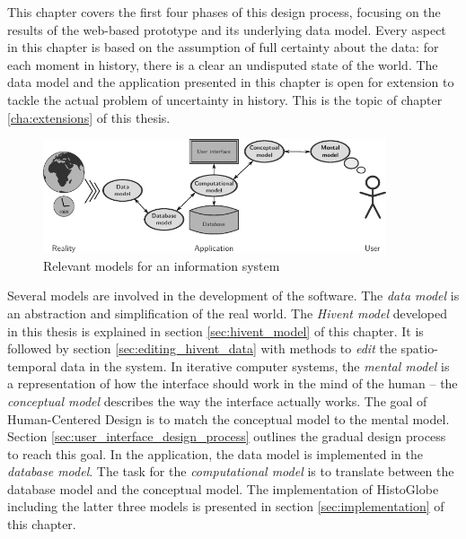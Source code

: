 This chapter covers the first four phases of this design process, focusing on the results of the web-based prototype and its underlying data model. Every aspect in this chapter is based on the assumption of full certainty about the data: for each moment in history, there is a clear an undisputed state of the world. The data model and the application presented in this chapter is open for extension to tackle the actual problem of uncertainty in history. This is the topic of chapter \ref{cha:extensions} of this thesis.

\begin{figure}[H]
  \vspace{1.5em}
  \centering
  \includegraphics[width=0.9\textwidth]{graphics/development/models}
  \caption{Relevant models for an information system}
  \label{fig:models}
\end{figure}

Several models are involved in the development of the software. The \emph{data model} is an abstraction and simplification of the real world. The \emph{Hivent model} developed in this thesis is explained in section \ref{sec:hivent_model} of this chapter. It is followed by section \ref{sec:editing_hivent_data} with methods to \emph{edit} the spatio-temporal data in the system. In iterative computer systems, the \emph{mental model} is a representation of how  the interface should work in the mind of the human -- the \emph{conceptual model} describes the way the interface actually works. The goal of Human-Centered Design is to match the conceptual model to the mental model. Section \ref{sec:user_interface_design_process} outlines the gradual design process to reach this goal. In the application, the data model is implemented in the \emph{database model}. The task for the \emph{computational model} is to translate between the database model and the conceptual model. The implementation of HistoGlobe including the latter three models is presented in section \ref{sec:implementation} of this chapter.

\newpage





